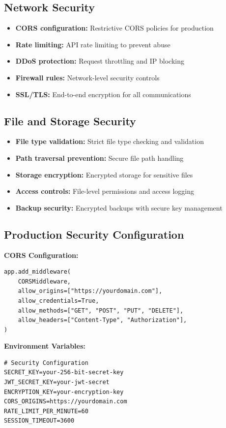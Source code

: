 {\subsection{Network Security}
\begin{itemize}
    \item \textbf{CORS configuration:} Restrictive CORS policies for production
    \item \textbf{Rate limiting:} API rate limiting to prevent abuse
    \item \textbf{DDoS protection:} Request throttling and IP blocking
    \item \textbf{Firewall rules:} Network-level security controls
    \item \textbf{SSL/TLS:} End-to-end encryption for all communications
\end{itemize}

\subsection{File and Storage Security}
\begin{itemize}
    \item \textbf{File type validation:} Strict file type checking and validation
    \item \textbf{Path traversal prevention:} Secure file path handling
    \item \textbf{Storage encryption:} Encrypted storage for sensitive files
    \item \textbf{Access controls:} File-level permissions and access logging
    \item \textbf{Backup security:} Encrypted backups with secure key management
\end{itemize}

\subsection{Production Security Configuration}
\textbf{CORS Configuration:}
\begin{verbatim}
app.add_middleware(
    CORSMiddleware,
    allow_origins=["https://yourdomain.com"],
    allow_credentials=True,
    allow_methods=["GET", "POST", "PUT", "DELETE"],
    allow_headers=["Content-Type", "Authorization"],
)
\end{verbatim}

\textbf{Environment Variables:}
\begin{verbatim}
# Security Configuration
SECRET_KEY=your-256-bit-secret-key
JWT_SECRET_KEY=your-jwt-secret
ENCRYPTION_KEY=your-encryption-key
CORS_ORIGINS=https://yourdomain.com
RATE_LIMIT_PER_MINUTE=60
SESSION_TIMEOUT=3600
\end{verbatim}

}
